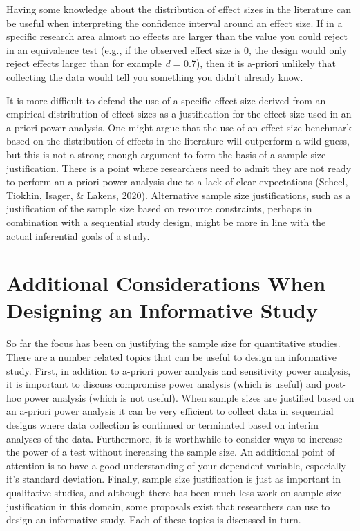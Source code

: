 \documentclass[
  english,
  ,jou, a4paper,floatsintext]{apa6}
\begin{document}
Having some knowledge about the distribution of effect sizes in the literature can be useful when interpreting the confidence interval around an effect size. If in a specific research area almost no effects are larger than the value you could reject in an equivalence test (e.g., if the observed effect size is 0, the design would only reject effects larger than for example \emph{d} = 0.7), then it is a-priori unlikely that collecting the data would tell you something you didn't already know.

It is more difficult to defend the use of a specific effect size derived from an empirical distribution of effect sizes as a justification for the effect size used in an a-priori power analysis. One might argue that the use of an effect size benchmark based on the distribution of effects in the literature will outperform a wild guess, but this is not a strong enough argument to form the basis of a sample size justification. There is a point where researchers need to admit they are not ready to perform an a-priori power analysis due to a lack of clear expectations (Scheel, Tiokhin, Isager, \& Lakens, 2020). Alternative sample size justifications, such as a justification of the sample size based on resource constraints, perhaps in combination with a sequential study design, might be more in line with the actual inferential goals of a study.

\hypertarget{additional-considerations-when-designing-an-informative-study}{%
\section{Additional Considerations When Designing an Informative Study}\label{additional-considerations-when-designing-an-informative-study}}

So far the focus has been on justifying the sample size for quantitative studies. There are a number related topics that can be useful to design an informative study. First, in addition to a-priori power analysis and sensitivity power analysis, it is important to discuss compromise power analysis (which is useful) and post-hoc power analysis (which is not useful). When sample sizes are justified based on an a-priori power analysis it can be very efficient to collect data in sequential designs where data collection is continued or terminated based on interim analyses of the data. Furthermore, it is worthwhile to consider ways to increase the power of a test without increasing the sample size. An additional point of attention is to have a good understanding of your dependent variable, especially it's standard deviation. Finally, sample size justification is just as important in qualitative studies, and although there has been much less work on sample size justification in this domain, some proposals exist that researchers can use to design an informative study. Each of these topics is discussed in turn.
\end{document}
